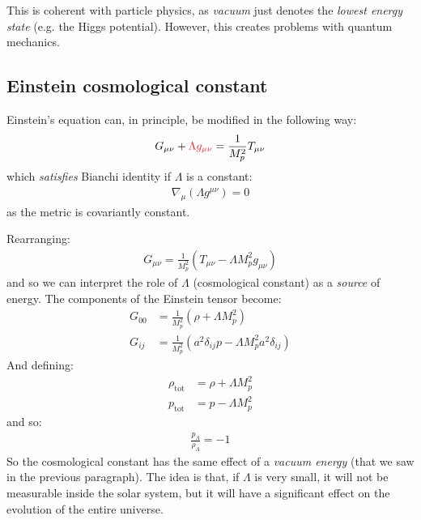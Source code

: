 \documentclass[../template.tex]{subfiles}
\begin{document}
This is coherent with particle physics, as \textit{vacuum} just denotes the \textit{lowest energy state} (e.g. the Higgs potential). However, this creates problems with quantum mechanics. 

\subsection{Einstein cosmological constant}
Einstein's equation can, in principle, be modified in the following way:
\begin{align*}
    G_{\mu \nu} + \textcolor{Red}{\Lambda g_{\mu \nu}} = \frac{1}{M_p^2} T_{\mu \nu} 
\end{align*}
which \textit{satisfies} Bianchi identity if $\Lambda$ is a constant:
\begin{align*}
    \nabla_\mu (\Lambda g^{\mu \nu}) = 0
\end{align*}  
as the metric is covariantly constant.

Rearranging:
\begin{align*}
    G_{\mu \nu} = \frac{1}{M_p^2} \left(T_{\mu \nu} - \Lambda M_p^2 g_{\mu \nu}\right) 
\end{align*}
and so we can interpret the role of $\Lambda$ (cosmological constant) as a \textit{source} of energy. The components of the Einstein tensor become:
\begin{align*}
    G_{00} &= \frac{1}{M_p^2} \left(\rho  + \Lambda M_p^2\right) \\
    G_{ij} &= \frac{1}{M_p^2} \left(a^2 \delta_{ij} p - \Lambda M_p^2 a^2 \delta_{ij} \right) 
\end{align*}   
And defining:
\begin{align*}
    \rho_{\mathrm{tot} } &= \rho + \Lambda M_p^2 \\ 
    p_{\mathrm{tot} } &= p - \Lambda M_p^2
\end{align*}
and so:
\begin{align*}
    \frac{p_{\Lambda }}{\rho_{\Lambda}}  = -1
\end{align*}
So the cosmological constant has the same effect of a \textit{vacuum energy} (that we saw in the previous paragraph). The idea is that, if $\Lambda$ is very small, it will not be measurable inside the solar system, but it will have a significant effect on the evolution of the entire universe.   
\end{document}
